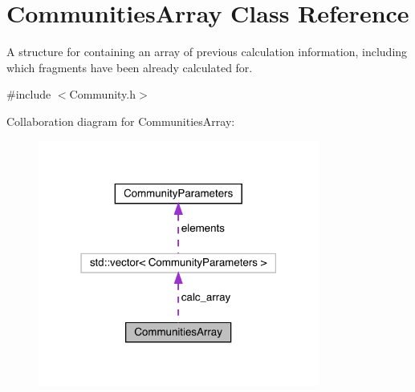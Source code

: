 \hypertarget{struct_communities_array}{}\section{Communities\+Array Class Reference}
\label{struct_communities_array}


A structure for containing an array of previous calculation information, including which fragments have been already calculated for.  




{\ttfamily \#include $<$Community.\+h$>$}



Collaboration diagram for Communities\+Array\+:
\nopagebreak
\begin{figure}[H]
\begin{center}
\leavevmode
\includegraphics[width=262pt]{struct_communities_array__coll__graph}
\end{center}
\end{figure}
